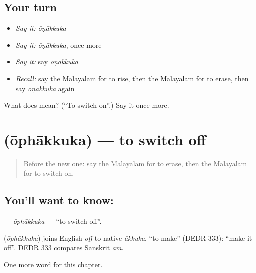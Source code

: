 \subsection*{Your turn}
\begin{itemize}
\raggedright
  \item \emph{Say it:} \emph{ōṇākkuka}
  \item \emph{Say it:} \emph{ōṇākkuka}, once more
  \item \emph{Say it:} say \emph{ōṇākkuka}
  \item \emph{Recall:} say the Malayalam for to rise, then the Malayalam for to erase, then say \emph{ōṇākkuka} again
\end{itemize}

\begin{tcolorbox}[breakable,colback=teal!4,colframe=teal!35!black,title={Before you move on}]
What does  mean? (\textquotedblleft{}To switch on\textquotedblright{}.) Say it once more.
\end{tcolorbox}
\section[\texorpdfstring{\ml{ഓഫാക്കുക} (ōphākkuka)}{ഓഫാക്കുക (ōphākkuka)}]{ (ōphākkuka) — to switch off}

\label{lesson:ML-C188-ophakkuka}



\begin{quote}
Before the new one: say the Malayalam for to erase, then the Malayalam for to switch on.
\end{quote}

\subsection*{You'll want to know: }
\textbf{} — \emph{ōphākkuka} — \textquotedblleft{}to switch off\textquotedblright{}.

\begin{cousinweb}
\textbf{} (\emph{ōphākkuka}) joins English \emph{off} to native \emph{ākkuka}, \textquotedblleft{}to make\textquotedblright{} (DEDR 333): \textquotedblleft{}make it off\textquotedblright{}. DEDR 333 compares Sanskrit \emph{ām}.
\end{cousinweb}

\begin{grammarlens}[title={What you've built}]
One more word for this chapter.
\end{grammarlens}

